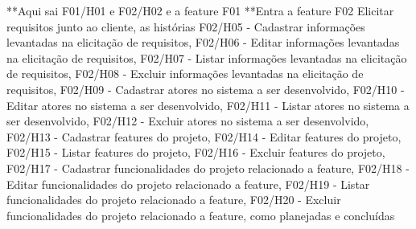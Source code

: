 **Aqui sai F01/H01 e F02/H02 e a feature F01
**Entra a feature F02 Elicitar requisitos junto ao cliente, as histórias F02/H05 - Cadastrar informações levantadas na elicitação de requisitos, F02/H06 - Editar informações levantadas na elicitação de requisitos, F02/H07 - Listar informações levantadas na elicitação de requisitos, F02/H08 - Excluir informações levantadas na elicitação de requisitos, F02/H09 - Cadastrar atores no sistema a ser desenvolvido, F02/H10 - Editar atores no sistema a ser desenvolvido, F02/H11 - Listar atores no sistema a ser desenvolvido, F02/H12 - Excluir atores no sistema a ser desenvolvido, F02/H13 - Cadastrar features do projeto, F02/H14 - Editar features do projeto, F02/H15 - Listar features do projeto, F02/H16 - Excluir features do projeto, F02/H17 - Cadastrar funcionalidades do projeto relacionado a feature, F02/H18 - Editar funcionalidades do projeto relacionado a feature, F02/H19 - Listar funcionalidades do projeto relacionado a feature, F02/H20 - Excluir funcionalidades do projeto relacionado a feature, como planejadas e concluídas

